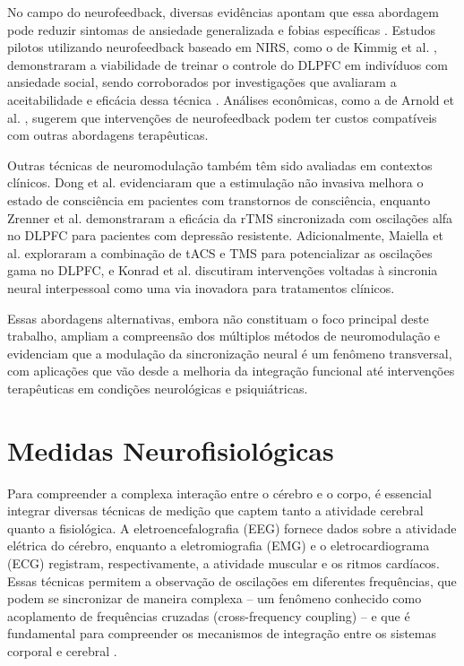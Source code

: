 No campo do neurofeedback, diversas evidências apontam que essa abordagem pode reduzir sintomas de ansiedade generalizada e fobias específicas \cite{Hou2021, Zilverstand2015}. Estudos pilotos utilizando neurofeedback baseado em NIRS, como o de Kimmig et al. \cite{Kimmig2019}, demonstraram a viabilidade de treinar o controle do DLPFC em indivíduos com ansiedade social, sendo corroborados por investigações que avaliaram a aceitabilidade e eficácia dessa técnica \cite{Direito2021, Steiner2014, LaMarca2018, CatalaLopez2017}. Análises econômicas, como a de Arnold et al. \cite{Arnold2013}, sugerem que intervenções de neurofeedback podem ter custos compatíveis com outras abordagens terapêuticas.

Outras técnicas de neuromodulação também têm sido avaliadas em contextos clínicos. Dong et al. \cite{dong2023efficacy} evidenciaram que a estimulação não invasiva melhora o estado de consciência em pacientes com transtornos de consciência, enquanto Zrenner et al. \cite{zrenner2020brain} demonstraram a eficácia da rTMS sincronizada com oscilações alfa no DLPFC para pacientes com depressão resistente. Adicionalmente, Maiella et al. \cite{maiella2022simultaneous} exploraram a combinação de tACS e TMS para potencializar as oscilações gama no DLPFC, e Konrad et al. \cite{konrad2024interpersonal} discutiram intervenções voltadas à sincronia neural interpessoal como uma via inovadora para tratamentos clínicos.

Essas abordagens alternativas, embora não constituam o foco principal deste trabalho, ampliam a compreensão dos múltiplos métodos de neuromodulação e evidenciam que a modulação da sincronização neural é um fenômeno transversal, com aplicações que vão desde a melhoria da integração funcional até intervenções terapêuticas em condições neurológicas e psiquiátricas.

\section{Medidas Neurofisiológicas}

Para compreender a complexa interação entre o cérebro e o corpo, é essencial integrar diversas técnicas de medição que captem tanto a atividade cerebral quanto a fisiológica. A eletroencefalografia (EEG) fornece dados sobre a atividade elétrica do cérebro, enquanto a eletromiografia (EMG) e o eletrocardiograma (ECG) registram, respectivamente, a atividade muscular e os ritmos cardíacos. Essas técnicas permitem a observação de oscilações em diferentes frequências, que podem se sincronizar de maneira complexa – um fenômeno conhecido como acoplamento de frequências cruzadas (cross-frequency coupling) – e que é fundamental para compreender os mecanismos de integração entre os sistemas corporal e cerebral \cite{criscuolo2022cognition, cohen2017where}.

